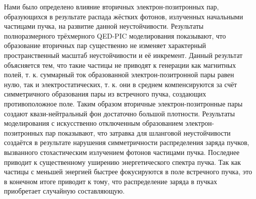 Нами было определено влияние вторичных электрон-позитронных пар, образующихся в результате распада жёстких фотонов, излученных начальными частицами пучка, на развитие данной неустойчивости.
Результаты полноразмерного трёхмерного QED-PIC моделирования показывают, что образование вторичных пар существенно не изменяет характерный пространственный масштаб неустойчивости и её инкремент.
Данный результат объясняется тем, что такие частицы не приводят к генерации как магнитных полей, т. к. суммарный ток образованной электрон-позитронной пары равен нулю, так и электростатических, т. к. они в среднем компенсируются за счёт симметричного образования пары из встречного пучка, создающих противоположное поле.
Таким образом вторичные электрон-позитронные пары создают квази-нейтральный фон достаточно большой плотности.
Результаты моделирования с искусственно отключенным образованием электрон-позитронных пар показывают, что затравка для шланговой неустойчивости создаётся в результате нарушения симметричности распределения заряда пучков, вызванного стохастическим излучением фотонов частицами пучка.
Последнее приводит к существенному уширению энергетического спектра пучка.
Так как частицы с меньшей энергией быстрее фокусируются в поле встречного пучка, это в конечном итоге приводит к тому, что распределение заряда в пучках приобретает случайную составляющую.

